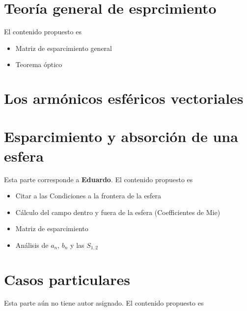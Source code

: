 \documentclass[12pts,a4paper]{book}
\begin{document}
\chapter{Teoría general de esprcimiento}
\label{ch:EsparcimientoGral}

	El contenido propuesto es

	\begin{itemize}
	 \item Matriz de esparcimiento general
	 \item Teorema óptico
	\end{itemize}

\chapter{Los armónicos esféricos vectoriales}
\label{ch:ArmonicosEsferico} 






\chapter{Esparcimiento y absorción de una esfera}
\label{ch:AEV} %
Esta parte corresponde a \textbf{Eduardo}. El contenido propuesto es

\begin{itemize}
 \item Citar a las Condiciones a la frontera de la esfera
 \item Cálculo del campo dentro y fuera de la esfera (Coefficientes de Mie)
 \item Matriz de esparcimiento
 \item Análisis de $a_n$, $b_n$ y las $S_{1,2}$
\end{itemize}

\chapter{Casos particulares}
\label{ch:AEV} %
Esta parte aún no tiene autor asignado. El contenido propuesto es
\end{document}
